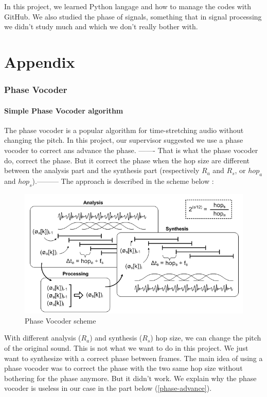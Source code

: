 \documentclass[]{article}
\begin{document}
\hspace{15pt} In this project, we learned Python langage and how to manage the codes with GitHub. We also studied the phase of signals, something that in signal processing we didn't study much and which we don't really bother with.


\newpage
\appendix
\part{Appendix}
\section{Phase Vocoder}\label{phase-vocoder-annex}
\subsection{Simple Phase Vocoder algorithm}
The phase vocoder is a popular algorithm for time-stretching audio without changing the pitch. In this project, our supervisor suggested we use a phase vocoder to correct ans advance the phase. ------- That is what the phase vocoder do, correct the phase. But it correct the phase when the hop size are different between the analysis part and the synthesis part (respectively $R_a$ and $R_s$, or $hop_a$ and $hop_s$).---------
The approach is described in the scheme below : 
\begin{figure}[H]
	\centering
	\includegraphics[scale = 0.6]{pvoverview.png}
	\caption{Phase Vocoder scheme}
\end{figure}
With different analysis ($R_a$) and synthesis ($R_s$) hop size, we can change the pitch of the original sound. This is not what we want to do in this project. We just want to synthesize with a correct phase between frames. The main idea of using a phase vocoder was to correct the phase with the two same hop size without bothering for the phase anymore. But it didn't work. We explain why the phase vocoder is useless in our case in the part below (\ref{phase-advance}).\\
\end{document}
